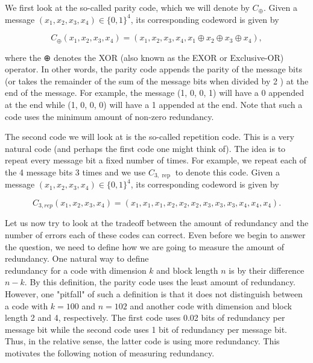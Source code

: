 \documentclass[10pt]{article}
\begin{document}
We first look at the so-called parity code, which we will denote by $C_{\oplus}$. Given a message $\left(x_{1}, x_{2}, x_{3}, x_{4}\right) \in\{0,1\}^{4}$, its corresponding codeword is given by


\begin{equation*}
C_{\oplus}\left(x_{1}, x_{2}, x_{3}, x_{4}\right)=\left(x_{1}, x_{2}, x_{3}, x_{4}, x_{1} \oplus x_{2} \oplus x_{3} \oplus x_{4}\right), \tag{1.2}
\end{equation*}


where the ⊕ denotes the XOR (also known as the EXOR or Exclusive-OR) operator. In other words, the parity code appends the parity of the message bits (or takes the remainder of the sum of the message bits when divided by 2 ) at the end of the message. For example, the message (1, 0, 0, 1) will have a 0 appended at the end while (1, 0, 0, 0) will have a 1 appended at the end. Note that such a code uses the minimum amount of non-zero redundancy.

The second code we will look at is the so-called repetition code. This is a very natural code (and perhaps the first code one might think of). The idea is to repeat every message bit a fixed number of times. For example, we repeat each of the 4 message bits 3 times and we use $C_{3, \text { rep }}$ to denote this code. Given a message $\left(x_{1}, x_{2}, x_{3}, x_{4}\right) \in\{0,1\}^{4}$, its corresponding codeword is given by


\begin{equation*}
C_{3, r e p}\left(x_{1}, x_{2}, x_{3}, x_{4}\right)=\left(x_{1}, x_{1}, x_{1}, x_{2}, x_{2}, x_{2}, x_{3}, x_{3}, x_{3}, x_{4}, x_{4}, x_{4}\right) . \tag{1.3}
\end{equation*}


Let us now try to look at the tradeoff between the amount of redundancy and the number of errors each of these codes can correct. Even before we begin to answer the question, we need to define how we are going to measure the amount of redundancy. One natural way to define\\
redundancy for a code with dimension $k$ and block length $n$ is by their difference $n-k$. By this definition, the parity code uses the least amount of redundancy. However, one "pitfall" of such a definition is that it does not distinguish between a code with $k=100$ and $n=102$ and another code with dimension and block length 2 and 4, respectively. The first code uses 0.02 bits of redundancy per message bit while the second code uses 1 bit of redundancy per message bit. Thus, in the relative sense, the latter code is using more redundancy. This motivates the following notion of measuring redundancy.
\end{document}
